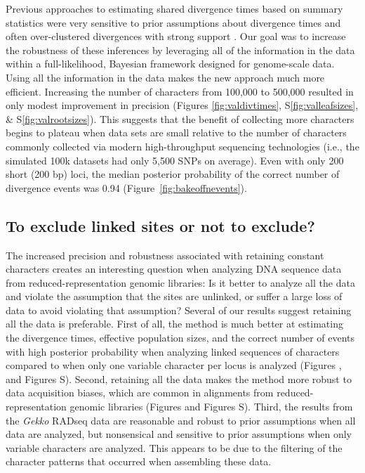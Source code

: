 Previous approaches to estimating shared divergence times based on summary
statistics were very sensitive to prior assumptions about divergence times and
often over-clustered divergences with strong support
\citep{Oaks2012,Hickerson2013,Oaks2014reply,Oaks2014dpp}.
Our goal was to increase the robustness of these inferences by leveraging all
of the information in the data within a full-likelihood, Bayesian framework
designed for genome-scale data.
Using all the information in the data makes the new approach much
more efficient.
Increasing the number of characters from 100,000 to 500,000 resulted
in only modest improvement in precision
(Figures
\ref{fig:valdivtimes}, S\ref{fig:valleafsizes}, \& S\ref{fig:valrootsizes}).
This suggests that the benefit of collecting more characters begins to plateau
when data sets are small relative to the number of characters commonly
collected via modern high-throughput sequencing technologies (i.e., the
simulated 100k datasets had only 5,500 SNPs on average).
Even with only 200 short (200 bp) loci, the median posterior probability
of the correct number of divergence events was 0.94
(Figure~\ref{fig:bakeoffnevents}).


\subsection{To exclude linked sites or not to exclude?}

The increased precision and robustness associated with retaining constant
characters creates an interesting question when analyzing DNA sequence data
from reduced-representation genomic libraries:
Is it better to analyze all the data and violate the assumption that the sites
are unlinked, or suffer a large loss of data to avoid violating that
assumption?
Several of our results suggest retaining all the data is preferable.
First of all, the method is much better at estimating the divergence times,
effective population sizes, and the correct number of events with high
posterior probability when analyzing linked sequences of characters compared to
when only one variable character per locus is analyzed
(Figures
,
and
Figures
S).
Second, retaining all the data makes the method more robust to data acquisition
biases, which are common in alignments from reduced-representation genomic
libraries
(Figures
and
Figures
S).
Third, the results from the \emph{Gekko} RADseq data are
reasonable and robust to prior assumptions when all data are analyzed,
but nonsensical and sensitive to prior assumptions when only variable
characters are analyzed.
This appears to be due to the filtering of the character patterns that occurred
when assembling these data.

